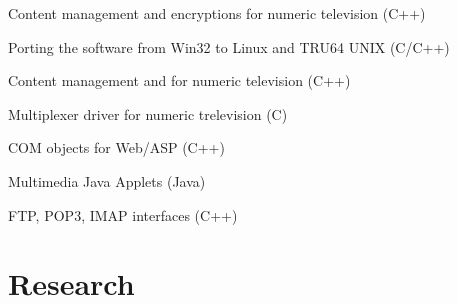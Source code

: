 \documentclass[a4paper]{deedy-resume} %
\begin{document}
\begin{minipage}[t]{0.66\textwidth}
\sectionspace %



\begin{tightitemize}
\item Content management and encryptions for numeric television (C++)
\item Porting the software from Win32 to Linux and TRU64 UNIX (C/C++)
\end{tightitemize}

\sectionspace %



\begin{tightitemize}
\item Content management and for numeric television (C++)
\item Multiplexer driver for numeric trelevision (C)
\end{tightitemize}

\sectionspace %



\begin{tightitemize}
\item COM objects for Web/ASP (C++)
\item Multimedia Java Applets (Java)
\item FTP, POP3, IMAP interfaces (C++)
\end{tightitemize}

\sectionspace %


\section{Research}



\end{minipage}
\end{document}
